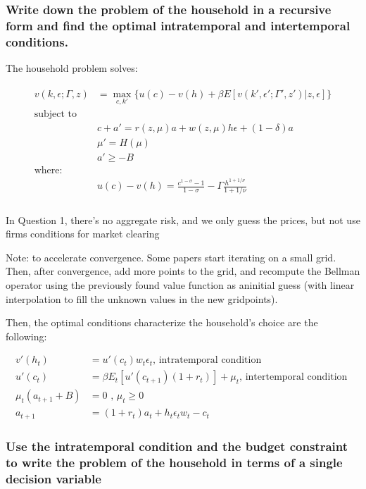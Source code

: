 \subsubsection{Write down the problem of the household in a recursive form and find the optimal intratemporal and intertemporal conditions.}

The household problem solves:

\begin{align} \label{hhproblem}
\begin{split}
v(k,\epsilon; \Gamma ,z) &= \max_{c,k'} \{ u(c) - v(h) + \beta E [v(k',\epsilon'; \Gamma' ,z')| z, \epsilon]\} \\
\text{subject to} \\
& c + a' = r(z,\mu)a + w(z,\mu)h \epsilon + (1-\delta)a \\
& \mu' = H(\mu) \\
& a' \geq -B \\
\text{where:} \\
&u(c) - v(h) = \frac{c^{1-\sigma} - 1}{1 - \sigma} - \Gamma \frac{h^{1+1/\nu}}{1+1/\nu} \\
\end{split}
\end{align}

{\color{red} In Question 1, there's no aggregate risk, and we only guess the prices, but not use firms conditions for market clearing}

Note: to accelerate convergence. Some papers start iterating on a small grid. Then, after convergence, add more points to the grid, and recompute the Bellman operator using the previously found value function as aninitial guess (with linear interpolation to fill the unknown values in the new gridpoints).



Then, the optimal conditions characterize the household's choice are the following:

\begin{align}
v'(h_t) &= u'(c_t)w_t \epsilon_t \text{, intratemporal condition }\\
u'(c_t) &= \beta E_t [u'(c_{t+1})(1+r_t)] + \mu_t  \text{, intertemporal condition }\\
\mu_t (a_{t+1} + B) &= 0 \text{ , } \mu_t \geq 0 \\
a_{t+1} &= (1+r_t)a_t + h_t \epsilon_t w_t - c_t 
\end{align}

\subsubsection{Use the intratemporal condition and the budget constraint to write the problem of the household in terms of a single decision variable}

